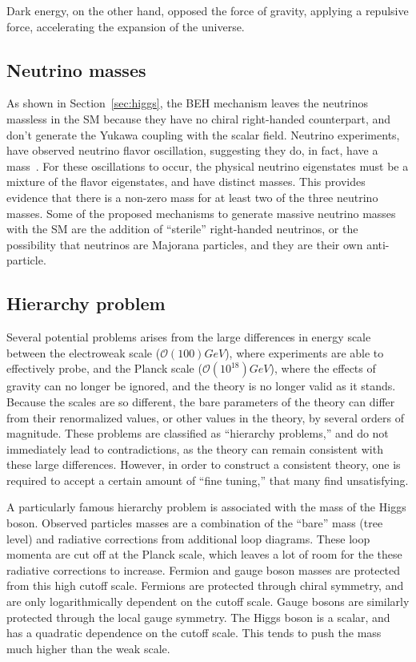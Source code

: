 Dark energy, on the other hand, opposed the force of gravity, applying a
repulsive force, accelerating the expansion of the universe.

\FloatBarrier
\subsection{Neutrino masses}

As shown in Section~\ref{sec:higgs}, the BEH mechanism leaves the neutrinos
massless in the SM because they have no chiral right-handed counterpart, and
don't generate the Yukawa coupling with the scalar field.
Neutrino experiments, have observed neutrino flavor oscillation, suggesting
they do, in fact, have a mass~\cite{PhysRevD.86.010001}.
For these oscillations to occur, the physical neutrino eigenstates must be
a mixture of the flavor eigenstates, and have distinct masses.
This provides evidence that there is a non-zero mass for at least two of the
three neutrino masses.
Some of the proposed mechanisms to generate massive neutrino masses with the
SM are the addition of ``sterile'' right-handed neutrinos, or the possibility
that neutrinos are Majorana particles, and they are their own anti-particle.

\FloatBarrier
\subsection{Hierarchy problem}

Several potential problems arises from the large differences in energy scale
between the electroweak scale ($\mathcal{O}(100) GeV$), where experiments are
able to effectively probe, and the Planck scale ($\mathcal{O}(10^{18}) GeV$),
where the effects of gravity can no longer be ignored, and the theory is no
longer valid as it stands.
Because the scales are so different, the bare parameters of the theory can
differ from their renormalized values, or other values in the theory,
by several orders of magnitude.
These problems are classified as ``hierarchy problems,'' and do not immediately
lead to contradictions, as the theory can remain consistent with these large
differences.
However, in order to construct a consistent theory, one is required to accept
a certain amount of ``fine tuning,'' that many find unsatisfying.

A particularly famous hierarchy problem is associated with the mass of the
Higgs boson.
Observed particles masses are a combination of the ``bare'' mass (tree level)
and radiative corrections from additional loop diagrams.
These loop momenta are cut off at the Planck scale, which leaves a lot of room
for the these radiative corrections to increase.
Fermion and gauge boson masses are protected from this high cutoff scale.
Fermions are protected through chiral symmetry, and are only logarithmically
dependent on the cutoff scale. 
Gauge bosons are similarly protected through the local gauge symmetry.
The Higgs boson is a scalar, and has a quadratic dependence on the cutoff
scale.
This tends to push the mass much higher than the weak scale.

